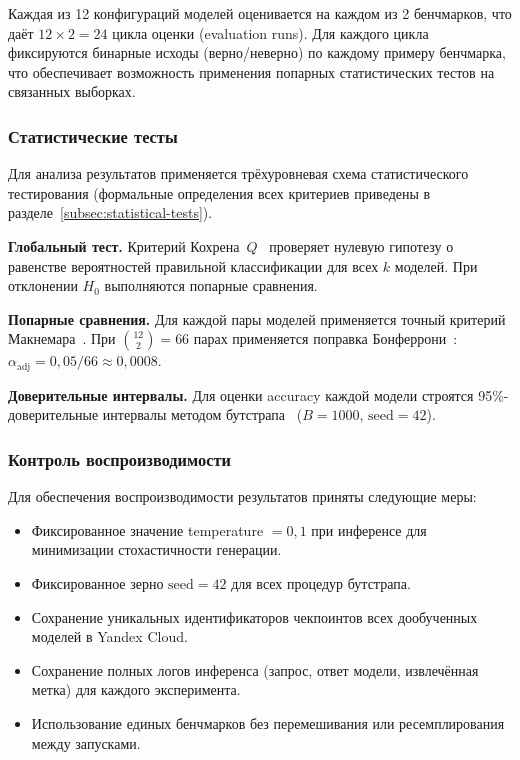 Каждая из 12 конфигураций моделей оценивается на каждом из 2 бенчмарков, что даёт $12 \times 2 = 24$ цикла оценки (evaluation runs). Для каждого цикла фиксируются бинарные исходы (верно/неверно) по каждому примеру бенчмарка, что обеспечивает возможность применения попарных статистических тестов на связанных выборках.

\subsubsection{Статистические тесты} \label{subsubsec:stat_tests}

Для анализа результатов применяется трёхуровневая схема статистического тестирования (формальные определения всех критериев приведены в разделе~\ref{subsec:statistical-tests}).

\textbf{Глобальный тест.} Критерий Кохрена~$Q$~\cite{cochran1950comparison} проверяет нулевую гипотезу о равенстве вероятностей правильной классификации для всех $k$ моделей. При отклонении $H_0$ выполняются попарные сравнения.

\textbf{Попарные сравнения.} Для каждой пары моделей применяется точный критерий Макнемара~\cite{mcnemar1947note}. При $\binom{12}{2} = 66$ парах применяется поправка Бонферрони~\cite{bonferroni1936teoria}: $\alpha_{\mathrm{adj}} = 0{,}05 / 66 \approx 0{,}0008$.

\textbf{Доверительные интервалы.} Для оценки accuracy каждой модели строятся 95\%-доверительные интервалы методом бутстрапа~\cite{efron1979bootstrap} ($B = 1000$, $\mathrm{seed} = 42$).

\subsubsection{Контроль воспроизводимости}

Для обеспечения воспроизводимости результатов приняты следующие меры:
\begin{itemize}
    \item Фиксированное значение temperature $= 0{,}1$ при инференсе для минимизации стохастичности генерации.
    \item Фиксированное зерно $\mathrm{seed} = 42$ для всех процедур бутстрапа.
    \item Сохранение уникальных идентификаторов чекпоинтов всех дообученных моделей в Yandex Cloud.
    \item Сохранение полных логов инференса (запрос, ответ модели, извлечённая метка) для каждого эксперимента.
    \item Использование единых бенчмарков без перемешивания или ресемплирования между запусками.
\end{itemize}
